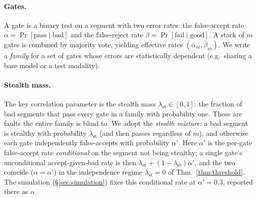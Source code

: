 \documentclass[11pt]{article}
\theoremstyle{remark}
\newcommand{\lst}{\lambda_{\mathrm{st}}}
\newcommand{\am}{\bar\alpha_m}
\newcommand{\bm}{\bar\beta_m}
\begin{document}
\paragraph{Gates.} A gate is a binary test on a segment with two error rates:
the false-accept rate $\alpha=\Pr[\text{pass}\mid\text{bad}]$ and the false-reject rate
$\beta=\Pr[\text{fail}\mid\text{good}]$.
A stack of $m$ gates is combined by majority vote,
yielding effective rates $(\am,\bm)$.
We write a \emph{family} for a set of gates whose errors are
statistically dependent (e.g.\ sharing a base model or a test modality).
\paragraph{Stealth mass.} The key correlation parameter is the stealth mass $\lst\in[0,1]$: the
fraction of bad segments that pass every gate in a family with probability one.
These are faults
the entire family is blind to. We adopt the \emph{stealth mixture}: a bad segment is stealthy with
probability $\lst$ (and then passes regardless of $m$), and otherwise each gate independently
false-accepts with probability $\alpha'$.
Here $\alpha'$ is the per-gate false-accept rate
\emph{conditional} on the segment not being stealthy; a single gate's unconditional
accept-given-bad rate is then $\lst+(1-\lst)\alpha'$, and the two coincide ($\alpha=\alpha'$) in the
independence regime $\lst=0$ of Thm.~\ref{thm:threshold}.
The simulation (\S\ref{sec:simulation})
fixes this conditional rate at $\alpha'=0.3$, reported there as $\alpha$.
\end{document}
